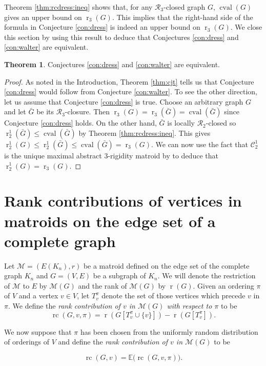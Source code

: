 \documentclass[11pt,a4paper]{article}
\theoremstyle{definition}
\newtheorem{theorem}{Theorem}[section]
\DeclareMathOperator{\rr}{r}
\DeclareMathOperator{\rc}{rc}
\DeclareMathOperator{\cval}{cval}
\newcommand{\cR}{\mathcal{R}}
\newcommand{\cM}{\mathcal{M}}
\newcommand{\cC}{\mathcal{C}}
\newcommand{\E}{\mathbb{E}}
\begin{document}
Theorem \ref{thm:rcdress:ineq} shows that, for any $\cR_3$-closed graph $G$, $\cval(G)$  gives an upper bound on $\rr_3(G)$. 
This implies that the right-hand side of the formula in Conjecture
\ref{con:dress} is indeed an upper bound on $\rr_3(G)$.
We close this section by using this result to deduce that Conjectures \ref{con:dress} and \ref{con:walter} are equivalent.	



\begin{theorem}
Conjectures \ref{con:dress} and \ref{con:walter}
are equivalent.
\end{theorem}

\begin{proof}
As noted in the Introduction, Theorem \ref{thm:cjt} tells us that Conjecture \ref{con:dress} would follow from Conjecture \ref{con:walter}. To see the other direction, let us assume that Conjecture \ref{con:dress} is true. Choose an arbitrary graph $G$ and let $\bar G$ be its $\cR_3$-closure. Then 
$\rr_3(G)=\rr_3(\bar G)=\cval(\bar G)$ since Conjecture \ref{con:dress} holds. On the other hand, $\bar G$ is locally $\cR_2$-closed so $\rr_2^1(\bar G)\leq\cval(\bar G)$ by Theorem \ref{thm:rcdress:ineq}.
This gives 
$\rr_2^1(G)\leq \rr_2^1(\bar G)\leq \cval(\bar G)=\rr_3(G).$
We can now use the fact that $\cC_2^1$ is the unique maximal abstract 3-rigidity matroid by \cite{CJT1} to deduce that $\rr_2^1(G)=\rr_3(G).$
\end{proof}

\section{Rank contributions of vertices in matroids on the edge set of a complete graph}\label{sec:rc}

Let $\cM=(E(K_n),r)$ be a matroid defined on the edge set of the complete graph $K_n$ and  $G=(V,E)$ be a subgraph of $K_n$. We will denote the restriction of $\cM$ to $E$ by $\cM(G)$ and the rank of $\cM(G)$ by $\rr(G)$. Given an  ordering $\pi$ of $V$ and a  vertex $v\in V$, let $T_v^\pi$ denote the set of those vertices which precede $v$ in $\pi$. 
We define the {\it rank contribution of $v$ in $\cM(G)$ with respect to $\pi$}  to be $$\rc(G, v, \pi) = \rr(G[T_v^\pi\cup \{v\}])-\rr(G[T_v^\pi]).$$

We now suppose that $\pi$ has been chosen from the uniformly random distribution of orderings of $V$ and define the {\it rank contribution of $v$ in $\cM(G)$} to be

$$\rc(G,v)= \E\big(\rc(G,v,\pi)\big).$$
\end{document}
